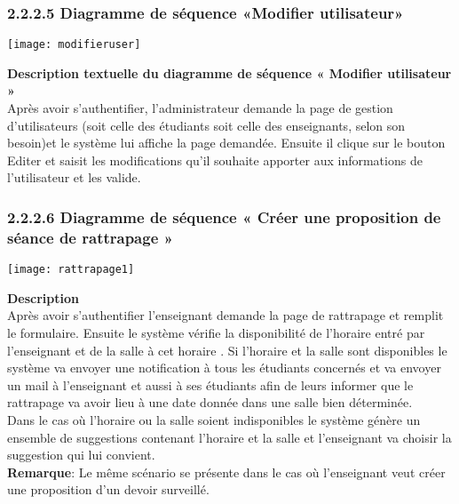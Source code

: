 \documentclass[a4paper,12pt,oneside]{report}
\begin{document}
\subsubsection{ 2.2.2.5 Diagramme de séquence «Modifier utilisateur»}
\begin{center}
\texttt{[image: modifieruser]}

\label{fig1}
\end{center}
\textbf{Description textuelle du diagramme de séquence « Modifier utilisateur »}\\
Après avoir s'authentifier, l'administrateur  demande la page de gestion d'utilisateurs (soit celle des étudiants soit celle des enseignants, selon son besoin)et le système lui affiche la page  demandée. Ensuite il clique sur le bouton Editer et  saisit les modifications qu'il souhaite apporter aux informations de l'utilisateur et les valide.  
\subsubsection{ 2.2.2.6 Diagramme de séquence « Créer une proposition de séance de rattrapage »}
\begin{center}
\texttt{[image: rattrapage1]}
\label{fig1}
\end{center}
\textbf{Description} \\
Après avoir s'authentifier l'enseignant demande la page de rattrapage et remplit le formulaire.
Ensuite le système vérifie la disponibilité de l'horaire entré par l'enseignant et de la salle à cet horaire .
Si l'horaire et la salle sont disponibles le système va envoyer une notification à tous les étudiants concernés et va envoyer  un mail à l'enseignant et aussi à ses étudiants afin de leurs informer que le rattrapage va avoir lieu à une date donnée dans une salle bien déterminée.\\
Dans le cas où  l'horaire ou la salle soient indisponibles le système génère un ensemble de suggestions contenant l'horaire et la salle  et l'enseignant va choisir la suggestion qui lui convient.\\
\textbf{Remarque}: Le même scénario se présente dans le cas où l'enseignant veut créer une proposition d'un devoir surveillé.
\end{document}
